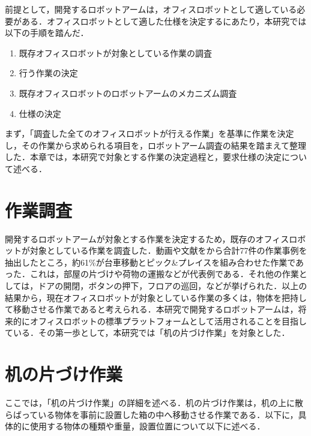 前提として，開発するロボットアームは，オフィスロボットとして適している必要がある．オフィスロボットとして適した仕様を決定するにあたり，本研究では以下の手順を踏んだ．
\begin{enumerate}
  \item 既存オフィスロボットが対象としている作業の調査
  \item 行う作業の決定
  \item 既存オフィスロボットのロボットアームのメカニズム調査
  \item 仕様の決定
\end{enumerate}
まず，「調査した全てのオフィスロボットが行える作業」を基準に作業を決定し，その作業から求められる項目を，ロボットアーム調査の結果を踏まえて整理した．本章では，本研究で対象とする作業の決定過程と，要求仕様の決定について述べる．

\section{作業調査}
開発するロボットアームが対象とする作業を決定するため，既存のオフィスロボットが対象としている作業を調査した．動画や文献をから合計77件の作業事例を抽出したところ，約61\%が台車移動とピック\&プレイスを組み合わせた作業であった．これは，部屋の片づけや荷物の運搬などが代表例である．それ他の作業としては，ドアの開閉，ボタンの押下，フロアの巡回，などが挙げられた．以上の結果から，現在オフィスロボットが対象としている作業の多くは，物体を把持して移動させる作業であると考えられる．本研究で開発するロボットアームは，将来的にオフィスロボットの標準プラットフォームとして活用されることを目指している．その第一歩として，本研究では「机の片づけ作業」を対象とした．

\section{机の片づけ作業}
ここでは，「机の片づけ作業」の詳細を述べる．机の片づけ作業は，机の上に散らばっている物体を事前に設置した箱の中へ移動させる作業である．以下に，具体的に使用する物体の種類や重量，設置位置について以下に述べる．
